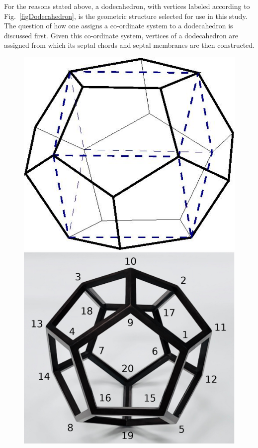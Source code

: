 For the reasons stated above, a dodecahedron, with vertices labeled according to Fig.~\ref{figDodecahedron}, is the geometric structure selected for use in this study. The question of how one assigns a co-ordinate system to a dodecahedron is discussed first.  Given this co-ordinate system, vertices of a dodecahedron are assigned from which its septal chords and septal membranes are then constructed.

\begin{figure}
	{\par\centering
		\resizebox*{0.45\textwidth}{0.3\textheight}
		{\includegraphics{figures/dodecahedron.jpg}} 
		\resizebox*{0.45\textwidth}{0.3\textheight}
		{\includegraphics{figures/dodecahedronVertices.jpg}}
}
\end{figure}
